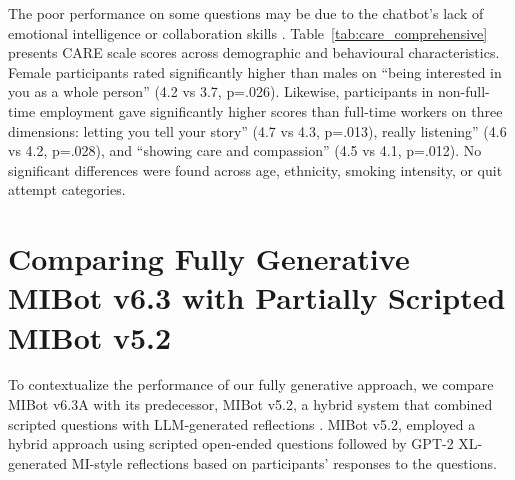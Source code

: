 The poor performance on some questions may be due to the chatbot's lack of emotional intelligence \citep{sabour-etal-2024-emobench} or collaboration skills \citep{Yang2024}. Table~\ref{tab:care_comprehensive} presents CARE scale scores across demographic and behavioural characteristics. Female participants rated significantly higher than males on ``being interested in you as a whole person'' (4.2 vs 3.7, p=.026). Likewise, participants in non-full-time employment gave significantly higher scores than full-time workers on three dimensions: letting you tell your story'' (4.7 vs 4.3, p=.013), really listening'' (4.6 vs 4.2, p=.028), and ``showing care and compassion'' (4.5 vs 4.1, p=.012). 
No significant differences were found across age, ethnicity, smoking intensity, or quit attempt categories. 







\section{Comparing Fully Generative MIBot v6.3 with Partially Scripted MIBot v5.2}
\label{sec:comparison-v52}

To contextualize the performance of our fully generative approach, we compare MIBot v6.3A with its predecessor, MIBot v5.2, a hybrid system that combined scripted questions with LLM-generated reflections \citep{brown2023mi}. MIBot v5.2, employed a hybrid approach using scripted open-ended questions followed by GPT-2 XL-generated MI-style reflections based on participants' responses to the questions.

